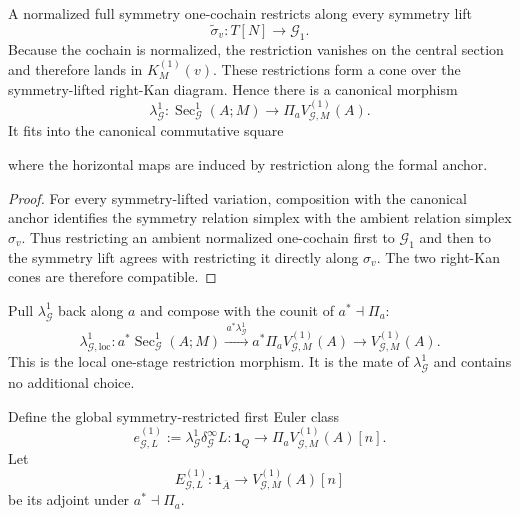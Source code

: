 \begin{construction}
\label{constr:symmetry-noether-symmetry-one-stage-restriction}
A normalized full symmetry one-cochain restricts along every symmetry lift
\[
\widetilde\sigma_v:T[N]\longrightarrow\mathcal G_1.
\]
Because the cochain is normalized, the restriction vanishes on the central
section and therefore lands in $K_M^{(1)}(v)$.  These restrictions form a cone over
the symmetry-lifted right-Kan diagram.  Hence there is a canonical morphism
\[
\lambda_{\mathcal G}^{1}:
\operatorname{Sec}_{\mathcal G}^{1}(A;M)
\longrightarrow
\Pi_aV_{\mathcal G,M}^{(1)}(A).
\]
It fits into the canonical commutative square
where the horizontal maps are induced by restriction along the formal anchor.
\end{construction}

\begin{proof}
For every symmetry-lifted variation, composition with the canonical anchor identifies
the symmetry relation simplex with the ambient relation simplex $\sigma_v$.  Thus
restricting an ambient normalized one-cochain first to $\mathcal G_1$ and then to
the symmetry lift agrees with restricting it directly along $\sigma_v$.  The two
right-Kan cones are therefore compatible.
\end{proof}

\begin{construction}
\label{constr:symmetry-noether-local-mate-of-symmetry-one-stage-restriction}
Pull $\lambda_{\mathcal G}^{1}$ back along $a$ and compose with the counit of
$a^*\dashv\Pi_a$:
\[
\lambda_{\mathcal G,\mathrm{loc}}^{1}:
a^*\operatorname{Sec}_{\mathcal G}^{1}(A;M)
\xrightarrow{\,a^*\lambda_{\mathcal G}^1\,}
a^*\Pi_aV_{\mathcal G,M}^{(1)}(A)
\longrightarrow
V_{\mathcal G,M}^{(1)}(A).
\]
This is the local one-stage restriction morphism.  It is the mate of
$\lambda_{\mathcal G}^1$ and contains no additional choice.
\end{construction}

\begin{definition}
\label{def:symmetry-noether-global-and-local-symmetry-euler-classes}
Define the global symmetry-restricted first Euler class
\[
\boxed{
e_{\mathcal G,L}^{(1)}
:=
\lambda_{\mathcal G}^{1}
\delta_{\mathcal G}^{\infty}L
:
\mathbf1_Q
\longrightarrow
\Pi_aV_{\mathcal G,M}^{(1)}(A)[n].
}
\]
Let
\[
\boxed{
E_{\mathcal G,L}^{(1)}
:
\mathbf1_{\overline A}
\longrightarrow
V_{\mathcal G,M}^{(1)}(A)[n]
}
\]
be its adjoint under $a^*\dashv\Pi_a$.
\end{definition}

